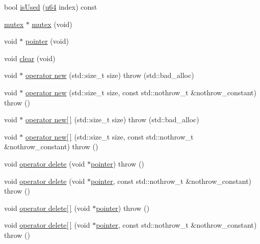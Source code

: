 \begin{DoxyCompactItemize}
\item 
bool \hyperlink{classcrap_1_1memory_1_1_static_allocator_a298757b73ebf47233da4cccde583aca9}{is\-Used} (\hyperlink{types_8h_a3f7e2bcbb0b4c338f3c4f6c937cd4234}{u64} index) const 
\item 
\hyperlink{classcrap_1_1mutex}{mutex} $\ast$ \hyperlink{classcrap_1_1memory_1_1_static_allocator_a59a3d4c22c7dc611e617bc699abcabed}{mutex} (void)
\item 
void $\ast$ \hyperlink{classcrap_1_1memory_1_1_static_allocator_a7b4661b59cdd3bf399603b23c2c71388}{pointer} (void)
\item 
void \hyperlink{classcrap_1_1memory_1_1_static_allocator_a7b62ef850694ed733427cbef43fe9387}{clear} (void)
\item 
void $\ast$ \hyperlink{classcrap_1_1memory_1_1_static_allocator_a3302e9ea2d3939832393f800adecbc5e}{operator new} (std\-::size\-\_\-t size)  throw (std\-::bad\-\_\-alloc)
\item 
void $\ast$ \hyperlink{classcrap_1_1memory_1_1_static_allocator_a1381623437a8c04c6f9629814e8a7e95}{operator new} (std\-::size\-\_\-t size, const std\-::nothrow\-\_\-t \&nothrow\-\_\-constant)  throw ()
\item 
void $\ast$ \hyperlink{classcrap_1_1memory_1_1_static_allocator_a12fdd732f0b275fb6c04dca7dfc9eec5}{operator new\mbox{[}$\,$\mbox{]}} (std\-::size\-\_\-t size)  throw (std\-::bad\-\_\-alloc)
\item 
void $\ast$ \hyperlink{classcrap_1_1memory_1_1_static_allocator_ae3c2747f8ea7343fd06ef04edba4588e}{operator new\mbox{[}$\,$\mbox{]}} (std\-::size\-\_\-t size, const std\-::nothrow\-\_\-t \&nothrow\-\_\-constant)  throw ()
\item 
void \hyperlink{classcrap_1_1memory_1_1_static_allocator_a8454794ba10b87b130a1c285641a2a6c}{operator delete} (void $\ast$\hyperlink{classcrap_1_1memory_1_1_static_allocator_a7b4661b59cdd3bf399603b23c2c71388}{pointer})  throw ()
\item 
void \hyperlink{classcrap_1_1memory_1_1_static_allocator_a70e4a324992431a55fd14dad938b0120}{operator delete} (void $\ast$\hyperlink{classcrap_1_1memory_1_1_static_allocator_a7b4661b59cdd3bf399603b23c2c71388}{pointer}, const std\-::nothrow\-\_\-t \&nothrow\-\_\-constant)  throw ()
\item 
void \hyperlink{classcrap_1_1memory_1_1_static_allocator_a9bfdcaf3a07ff290979f20ad5b82c1bc}{operator delete\mbox{[}$\,$\mbox{]}} (void $\ast$\hyperlink{classcrap_1_1memory_1_1_static_allocator_a7b4661b59cdd3bf399603b23c2c71388}{pointer})  throw ()
\item 
void \hyperlink{classcrap_1_1memory_1_1_static_allocator_a5e0c0b2d9076a23d7a8166f09052b24a}{operator delete\mbox{[}$\,$\mbox{]}} (void $\ast$\hyperlink{classcrap_1_1memory_1_1_static_allocator_a7b4661b59cdd3bf399603b23c2c71388}{pointer}, const std\-::nothrow\-\_\-t \&nothrow\-\_\-constant)  throw ()
\end{DoxyCompactItemize}
